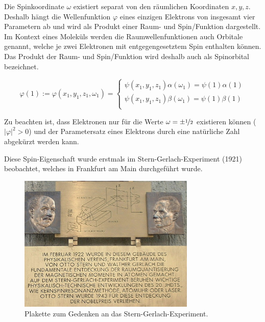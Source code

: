Die Spinkoordinate $\omega$ existiert separat von den räumlichen Koordinaten $x,y,z$.
Deshalb hängt die Wellenfunktion $\varphi$ eines einzigen Elektrons
von insgesamt vier Parametern ab
und wird als Produkt einer Raum- und Spin\-/Funktion dargestellt.
Im Kontext eines Moleküls werden die Raumwellenfunktionen auch Orbitale genannt, welche
je zwei Elektronen mit entgegengesetztem Spin enthalten können.
Das Produkt der Raum- und Spin\-/Funktion wird deshalb auch als Spinorbital bezeichnet.

\begin{equation}\label{spin}
  \varphi(1) := \varphi(x_1, y_1, z_1, \omega_1) = \begin{cases}
    \psi(x_1, y_1, z_1) \alpha(\omega_1) = \psi(1) \alpha(1)\\
    \psi(x_1, y_1, z_1) \beta(\omega_1) = \psi(1) \beta(1)\\
  \end{cases}
\end{equation}

Zu beachten ist, dass Elektronen nur für die Werte 
$\omega = \pm \nicefrac{1}{2}$ existieren können ($\lvert \varphi \rvert^2 > 0$) und
der Parametersatz eines Elektrons durch eine natürliche Zahl abgekürzt werden kann.

\cite[S. 45]{szabo_ostlund_1996}

Diese Spin-Eigenschaft wurde erstmals im Stern-Gerlach-Experiment (1921) beobachtet, 
welches in Frankfurt am Main durchgeführt wurde.
\cite{tc1_spin}

\begin{figure}[h]
\begin{center}
    \includegraphics[width=0.75\textwidth]{res/sterngerlach2.jpg}
\end{center}
    \caption{Plakette zum Gedenken an das Stern-Gerlach-Experiment. \cite{sterngerlach}}
\end{figure}


